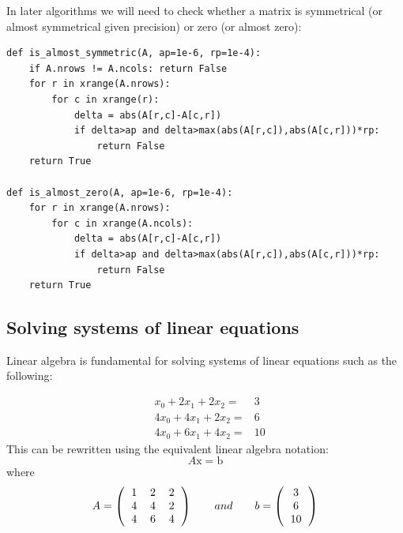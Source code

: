 \documentclass[justified,sixbynine]{tufte-book}
\def\ft{\small\tt}
\theoremstyle{plain}%
\theoremstyle{definition}
\theoremstyle{remark}
\begin{document}
\begin{fullwidth}

In later algorithms we will need to check whether a matrix is symmetrical (or almost symmetrical given precision) or zero (or almost zero):

\begin{lstlisting}[caption={in file: {\ft nlib.py}}]
def is_almost_symmetric(A, ap=1e-6, rp=1e-4):
    if A.nrows != A.ncols: return False
    for r in xrange(A.nrows):
        for c in xrange(r):
            delta = abs(A[r,c]-A[c,r])
            if delta>ap and delta>max(abs(A[r,c]),abs(A[c,r]))*rp:
                return False
    return True

def is_almost_zero(A, ap=1e-6, rp=1e-4):
    for r in xrange(A.nrows):
        for c in xrange(A.ncols):
            delta = abs(A[r,c]-A[c,r])
            if delta>ap and delta>max(abs(A[r,c]),abs(A[c,r]))*rp:
                return False
    return True
\end{lstlisting}

\goodbreak\subsection{Solving systems of linear equations}


Linear algebra is fundamental for solving systems of linear equations such as the following:

\begin{eqnarray}
&x_0+2x_1+2x_2=&3 \\
&4x_0+4x_1+2x_2=&6 \\
&4x_0+6x_1+4x_2=&10
\end{eqnarray}
This can be rewritten using the equivalent linear algebra notation:
\begin{equation}
A \textrm{x} = \textrm{b}
\end{equation}
where
\begin{equation}
A = \left(\begin{tabular}{ccc}
1 & 2 & 2 \\
4 & 4 & 2 \\
4 & 6 & 4 \\
\end{tabular}\right) \qquad and \qquad
b =
\left(\begin{tabular}{c}
3 \\
6 \\
10 \\
\end{tabular}\right)
\end{equation}


\end{fullwidth}
\end{document}
